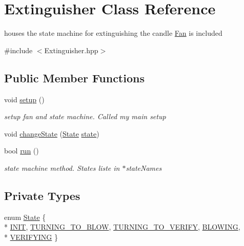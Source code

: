 \hypertarget{classExtinguisher}{\section{Extinguisher Class Reference}
\label{classExtinguisher}
}


houses the state machine for extinguishing the candle \hyperlink{classFan}{Fan} is included  




{\ttfamily \#include $<$Extinguisher.\-hpp$>$}

\subsection*{Public Member Functions}
\begin{DoxyCompactItemize}
\item 
void \hyperlink{classExtinguisher_a5a6f4652de68d87d3c94a5133770036f}{setup} ()
\begin{DoxyCompactList}\small\item\em setup fan and state machine. Called my main setup \end{DoxyCompactList}\item 
void \hyperlink{classExtinguisher_add162f2794a81915e50bdde84f582ab9}{change\-State} (\hyperlink{classExtinguisher_a969a7cce3382fc5d67f687540896e3ab}{State} \hyperlink{classExtinguisher_aa67c13dc091e5dc2c054d53f7fcae69b}{state})
\item 
bool \hyperlink{classExtinguisher_ab11afd0f55af4485a1a4f369c7743a40}{run} ()
\begin{DoxyCompactList}\small\item\em state machine method. States liste in $\ast$state\-Names \end{DoxyCompactList}\end{DoxyCompactItemize}
\subsection*{Private Types}
\begin{DoxyCompactItemize}
\item 
enum \hyperlink{classExtinguisher_a969a7cce3382fc5d67f687540896e3ab}{State} \{ \\*
\hyperlink{classExtinguisher_a969a7cce3382fc5d67f687540896e3aba25f6661e71a4e779393f9e1d0afdb9cd}{I\-N\-I\-T}, 
\hyperlink{classExtinguisher_a969a7cce3382fc5d67f687540896e3aba2ff965592f07601418ca89485f335cb2}{T\-U\-R\-N\-I\-N\-G\-\_\-\-T\-O\-\_\-\-B\-L\-O\-W}, 
\hyperlink{classExtinguisher_a969a7cce3382fc5d67f687540896e3aba1defb0b77459569c811478b71cbbf13e}{T\-U\-R\-N\-I\-N\-G\-\_\-\-T\-O\-\_\-\-V\-E\-R\-I\-F\-Y}, 
\hyperlink{classExtinguisher_a969a7cce3382fc5d67f687540896e3aba9d3fa0261c6cf909a97ca68eee27ed0d}{B\-L\-O\-W\-I\-N\-G}, 
\\*
\hyperlink{classExtinguisher_a969a7cce3382fc5d67f687540896e3aba5152bb2f7b6f5f9f8b53204d0ae61ddd}{V\-E\-R\-I\-F\-Y\-I\-N\-G}
 \}
\end{DoxyCompactItemize}
